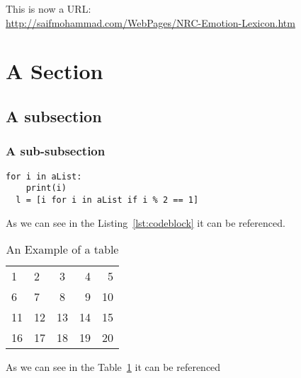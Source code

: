 This is now a URL\@:\\
\url{http://saifmohammad.com/WebPages/NRC-Emotion-Lexicon.htm}


\section{A Section}\label{sec:A Section}


\subsection{A subsection}\label{sub:A subsection}


\subsubsection{A sub-subsection}\label{subs:A sub-subsection}


\begin{lstlisting}[caption={A codeblock},label=lst:codeblock,frame=single]
  for i in aList:
    print(i)
  l = [i for i in aList if i % 2 == 1]
\end{lstlisting}

As we can see in the Listing~\ref{lst:codeblock} it can be referenced.


\begin{table}[H]
  \begin{tabular}{llcrr}
  1  & 2  & 3  & 4  & 5  \\
  6  & 7  & 8  & 9  & 10 \\
  11 & 12 & 13 & 14 & 15 \\
  16 & 17 & 18 & 19 & 20
  \end{tabular}
  \caption{An Example of a table}\label{tab:table}
\end{table}

As we can see in the Table~\ref{tab:table} it can be referenced
